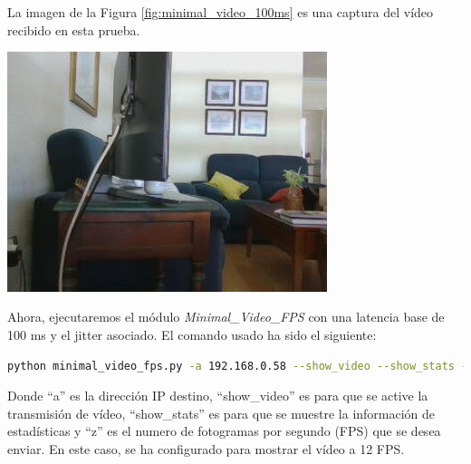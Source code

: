 \newpage
La imagen de la Figura \ref{fig:minimal_video_100ms} es una captura del vídeo recibido en esta prueba.
\begin{center}
  \includegraphics[width = 0.7\textwidth]{images/VideoRecibido5.1.png}
  \label{fig:minimal_video_100ms}
\end{center}

\newpage

Ahora, ejecutaremos el módulo \textit{Minimal\_Video\_FPS} con una latencia base de 100 ms y el jitter asociado. El comando usado ha sido el siguiente:

\begin{lstlisting}[language=bash, basicstyle=\ttfamily\scriptsize]
    python minimal_video_fps.py -a 192.168.0.58 --show_video --show_stats -z 12
\end{lstlisting}
Donde ``a'' es la dirección IP destino, ``show\_video'' es para que se active la transmisión de vídeo, ``show\_stats'' es para que se muestre la información de estadísticas y ``z'' es el numero de fotogramas por segundo (FPS) que se desea enviar. En este caso, se ha configurado para mostrar el vídeo a 12 FPS.
\vspace{\baselineskip}

